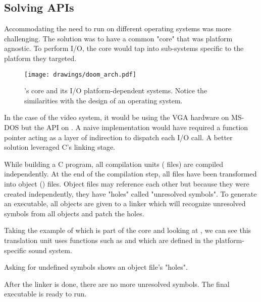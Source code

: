 \subsection{Solving APIs}
Accommodating the need to run on different operating systems was more challenging. The solution was to have a common "core" that was platform agnostic. To perform I/O, the core would tap into sub-systems specific to the platform they targeted.\\
\par
\begin{figure}[H]
\centering
\texttt{[image: drawings/doom\_arch.pdf]}
\caption{\doom{}'s core and its I/O platform-dependent systems. Notice the similarities with the design of an operating system.}
\end{figure}
\par
In the case of the video system, it would be using the VGA hardware on MS-DOS but the  API on \NeXT. A naive implementation would have required a function pointer acting as a layer of indirection to dispatch each I/O call. A better solution leveraged C's linking stage.\\
\par
 While building a C program, all compilation units ( files) are compiled independently. At the end of the compilation step, all  files have been transformed into object () files. Object files may reference each other but because they were created independently, they have "holes" called "unresolved symbols". To generate an executable, all objects are given to a linker which will recognize unresolved symbols from all objects and patch the holes.\\
 \par
 Taking the example of  which is part of the core and looking at , we can see this translation unit uses functions such as  and  which are defined in the platform-specific sound system.\pagebreak

Asking  for undefined symbols shows an object file's "holes".\\
 \par
{}
\par
After the linker is done, there are no more unresolved symbols. The final executable is ready to run.\\
\par
{}




